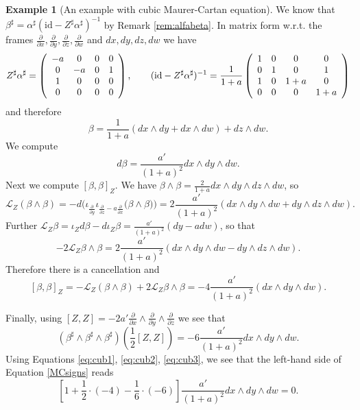 \documentclass[11pt,thmsa]{amsart}
\theoremstyle{definition}
\newtheorem{example}[theorem]{Example}
\newcommand{\id}{\mathrm{id}}
\newcommand{\cL}{\mathcal{L}}
\newcommand{\pd}[1]{\frac{\partial}{\partial #1}} %
\begin{document}
{\begin{example}[An example with cubic Maurer-Cartan equation]
We know that $\beta^\sharp=\alpha^\sharp(\id - Z^{\sharp}\alpha^\sharp)^{-1}$ by Remark \ref{rem:alfabeta}. In matrix form w.r.t. the frames $\pd{x},\pd{y},\pd{z},\pd{w}$ and 
$dx,dy,dz,dw$ we have
$$
Z^\sharp\alpha^\sharp=\left(\begin{array}{c  c   c c}  -a & 0 & 0 & 0  \\ 0& -a & 0 & 1  \\  1 & 0 & 0 &0 \\0 & 0 &0 & 0 \end{array}\right),
\quad\quad
(\mathrm{id}-Z^\sharp \alpha^\sharp)^{-1} =  \frac{1}{1+a}\left(\begin{array}{c  c   c c}  1 & 0 & 0 &0 \\ 0& 1 & 0 &1  \\    1 & 0 & 1+a & 0 \\ 0 &0 & 0 & 1+a \end{array}\right)$$
and therefore
$$\beta= \frac{1}{1+a}(dx\wedge dy+dx\wedge dw)+dz\wedge dw.$$
We compute \begin{equation}\label{eq:cub1}
d\beta=\frac{a'}{(1+a)^2}dx\wedge dy\wedge dw.
\end{equation}
Next we compute $[\beta,\beta]_Z$.
We have $\beta\wedge\beta=\frac{2}{1+a}dx\wedge dy\wedge dz\wedge dw$, so
$$\cL_{Z}(\beta\wedge \beta)=-d\Big(\iota_{\pd{y}}\iota_{\pd{z}-a\pd{x}}\big(\beta\wedge\beta\big)\Big)=2\frac{a'}{(1+a)^2}(dx\wedge dy\wedge dw+dy\wedge dz\wedge dw).$$
Further $\cL_{Z}\beta=\iota_Zd\beta-d\iota_Z\beta=\frac{a'}{(1+a)^2}(dy-adw)$, so that
$$-2\cL_{Z}\beta\wedge \beta=2\frac{a'}{(1+a)^2}(dx\wedge dy\wedge dw-dy\wedge dz\wedge dw).$$ Therefore there is a cancellation and 
\begin{equation}\label{eq:cub2}
[\beta,\beta]_Z=-\cL_{Z}(\beta\wedge \beta)+2\cL_{Z}\beta\wedge \beta=-4\frac{a'}{(1+a)^2}(dx\wedge dy\wedge dw). 
\end{equation}

Finally, using $[Z,Z]=-2a'\pd{x}\wedge\pd{y}\wedge\pd{z}$ we see that
\begin{equation}\label{eq:cub3}
(\beta^\sharp\wedge \beta^\sharp\wedge\beta^\sharp )(\frac{1}{2}[Z,Z])
=-6\frac{a'}{(1+a)^2}dx\wedge dy\wedge dw.
\end{equation}
Using Equations \eqref{eq:cub1}, \eqref{eq:cub2},
\eqref{eq:cub3}, we see that 
the left-hand side of Equation \eqref{MCsigns} reads
$$[1+\frac{1}{2}\cdot(-4)-\frac{1}{6}\cdot(-6)]\frac{a'}{(1+a)^2}dx\wedge dy\wedge dw=0.$$
\end{example}
 
}
\end{document}
